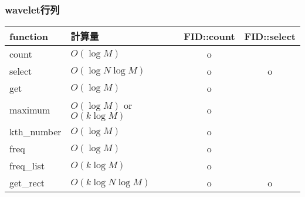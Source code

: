 \subsubsection{wavelet行列}
\begin{table} [htb]
  \begin{tabular} { |l|l|c|c| } \hline
    function & 計算量 & FID::count & FID::select\\ \hline
    count & $O(\log M)$ & o & \\ \hline
    select & $O(\log N \log M)$ & o & o \\ \hline
    get & $O(\log M)$ & o & \\ \hline
    maximum & $O(\log M)$ or $O(k\log M)$ & o & \\ \hline
    kth\_number & $O(\log M)$ & o & \\ \hline
    freq & $O(\log M)$ & o & \\ \hline
    freq\_list & $O(k\log M)$ & o & \\ \hline
    get\_rect & $O(k\log N \log M)$ & o & o \\ \hline
  \end{tabular}
\end{table}

